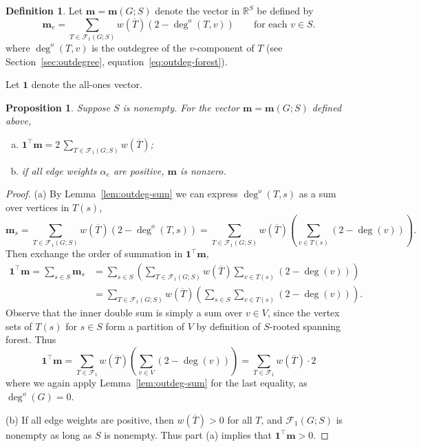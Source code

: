 \documentclass{amsart}
\newtheorem{prop}[thm]{Proposition}
\theoremstyle{definition}
\newtheorem{dfn}[thm]{Definition}
\newcommand{\RR}{\mathbb{R}}
\newcommand{\bone}{\mathbf{1}}
\newcommand{\boldm}{\mathbf{m}}
\newcommand{\tr}{\intercal}
\newcommand{\trees}{\mathcal{F}_1}
\newcommand{\degout}{\deg^o}
\begin{document}
\begin{dfn}
\label{dfn:m-vector}
Let $\boldm = \boldm(G;S)$ denote the vector in $\RR^S$ be defined by
\begin{equation}
\label{eq:m-vector}
\boldm_v =  \sum_{T \in \trees(G;S)} w(\overline{T}) (2 - \degout(T,v))
\qquad\text{for each }v \in S.
\end{equation}
where $\degout(T,v)$ is the outdegree of the $v$-component of $T$ (see Section~\ref{sec:outdegree}, equation~\eqref{eq:outdeg-forest}).
\end{dfn}

Let $\bone$ denote the all-ones vector.
\begin{prop}
\label{prop:m-sum}
Suppose $S$ is nonempty.
For the vector $\boldm = \boldm(G; S)$ defined above, 
\begin{enumerate}[(a)]
\item 
$\displaystyle \bone^\tr \boldm = 2 \,\sum_{T \in \trees(G;S)} w(\overline{T})$;

\item 
if all edge weights $\alpha_e$ are positive, $\boldm$ is nonzero.
\end{enumerate}
\end{prop}
\begin{proof}
(a)
By Lemma~\ref{lem:outdeg-sum} we can express $\degout(T, s)$ as a sum over vertices in $T(s)$,
\[
	\boldm_s = \sum_{T \in \trees(G;S)} w(\overline{T}) (2 - \degout (T,s))
= \sum_{T \in \trees(G;S)} w(\overline{T}) \left( \sum_{v \in T(s)}(2 - \deg(v))\right).
\]
Then exchange the order of summation in $\bone^\tr \boldm$,
\begin{align}
	\bone^\tr \boldm = \sum_{s\in S} \boldm_s &= \sum_{s \in S} \left( \sum_{T \in \trees(G;S)} w(\overline{T}) \sum_{v \in T(s)}(2 - \deg(v)) \right) \\
	&= \sum_{T \in \trees(G;S)} w(\overline{T}) \left( \sum_{s\in S} \sum_{v \in T(s)} (2 - \deg(v)) \right) .
\end{align}
Observe that the inner double sum is simply a sum over $v \in V$,
since the vertex sets of $T(s)$ for $s \in S$ form a partition of $V$ by definition of $S$-rooted spanning forest.
Thus 
\[
	\bone^\tr \boldm = \sum_{T \in \trees} w(\overline{T}) \left( \sum_{v \in V} (2 - \deg(v))\right)
	= \sum_{T \in \trees} w(\overline{T}) \cdot 2 
\]
where we again apply Lemma~\ref{lem:outdeg-sum} for the last equality, as $\degout(G) = 0$.

(b) 
If all edge weights are positive, then $w(\overline{T}) > 0$ for all $T$, and $\trees(G; S)$ is nonempty as long as $S$ is nonempty. 
Thus part (a) implies that $\bone^\tr \boldm > 0$.
\end{proof}
\end{document}
